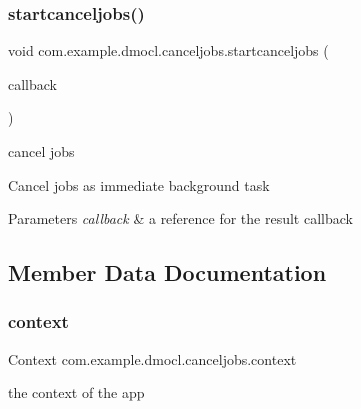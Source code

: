 \subsubsection{\texorpdfstring{startcanceljobs()}{startcanceljobs()}}
{\footnotesize\ttfamily void com.\+example.\+dmocl.\+canceljobs.\+startcanceljobs (\begin{DoxyParamCaption}\item[{final \mbox{\hyperlink{interfacecom_1_1example_1_1dmocl_1_1RepositoryCallback}{Repository\+Callback}}$<$ \mbox{\hyperlink{classcom_1_1example_1_1dmocl_1_1immediatejobs_1_1jobschedresponse}{jobschedresponse}} $>$}]{callback }\end{DoxyParamCaption})\hspace{0.3cm}{\ttfamily [inline]}}



cancel jobs 

Cancel jobs as immediate background task 
\begin{DoxyParams}{Parameters}
{\em callback} & a reference for the result callback \\
\hline
\end{DoxyParams}


\subsection{Member Data Documentation}
\mbox{\label{classcom_1_1example_1_1dmocl_1_1canceljobs_af7ab7e8cec6d942a27672c51a2334d42}} 
\subsubsection{\texorpdfstring{context}{context}}
{\footnotesize\ttfamily Context com.\+example.\+dmocl.\+canceljobs.\+context\hspace{0.3cm}{\ttfamily [private]}}



the context of the app 

\mbox{\label{classcom_1_1example_1_1dmocl_1_1canceljobs_abc0e279999a684fd756e8d4241250daa}} 
